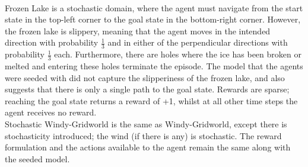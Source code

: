 \\Frozen Lake is a stochastic domain, where the agent must navigate from the start state in the top-left corner to the goal state in the bottom-right corner. However, the frozen lake is slippery, meaning that the agent moves in the intended direction with probability $\frac{1}{3}$ and in either of the perpendicular directions with probability $\frac{1}{3}$ each. Furthermore, there are holes where the ice has been broken or melted and entering these holes terminate the episode. The model that the agents were seeded with did not capture the slipperiness of the frozen lake, and also suggests that there is only a single path to the goal state. Rewards are sparse; reaching the goal state returns a reward of +1, whilst at all other time steps the agent receives no reward.
\\Stochastic Windy-Gridworld is the same as Windy-Gridworld, except there is stochasticity introduced;  the wind (if there is any) is stochastic. The reward formulation and the actions available to the agent remain the same along with the seeded model.



